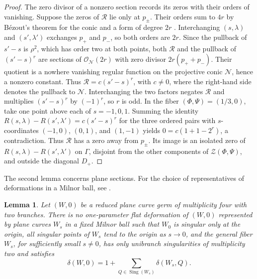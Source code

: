 \documentclass[11pt,letterpaper]{article}
\numberwithin{equation}{section}
\newtheorem{lemma}[lemma]{Lemma}
\theoremstyle{remark}
\theoremstyle{plain}
\begin{document}
\begin{proof}
The zero divisor of a nonzero section records its zeros with their
orders of vanishing.
Suppose the zeros of $\mathcal R$ lie only at $p_\pm$.  Their orders sum to $4r$
by B\'ezout's theorem for the conic and a form of degree $2r$
\cite[Section~2.6, p.~54]{CasasAlvero}.
Interchanging $(s,\lambda)$ and $(s',\lambda')$ exchanges $p_+$ and $p_-$, so both
orders are $2r$.  Since the pullback of $s'-s$ is $\rho^2$, which has order two at both
points, both $\mathcal R$ and the pullback of $(s'-s)^r$ are
sections of $\mathcal O_{\mathcal N}(2r)$ with zero divisor
$2r(p_++p_-)$.  Their quotient is a nowhere vanishing regular
function on the projective conic $\mathcal N$, hence a
nonzero constant.
Thus $\mathcal R=c(s'-s)^r$, with $c\neq0$,
where the right-hand side denotes the pullback to $\mathcal N$.
Interchanging the two factors negates $\mathcal R$ and multiplies
$(s'-s)^r$ by $(-1)^r$, so $r$ is odd.
In the fiber $(\Phi,\Psi)=(1/3,0)$, take one
point above each of $s=-1,0,1$.  Summing the identity
$R(s,\lambda)-R(s',\lambda')=c(s'-s)^r$ for the three
ordered pairs with $s$-coordinates $(-1,0)$, $(0,1)$, and $(1,-1)$
yields $0=c(1+1-2^r)$, a contradiction.
Thus $\mathcal R$ has a zero away from $p_\pm$.  Its image is an isolated zero
of $R(s,\lambda)-R(s',\lambda')$ on $\Gamma$, disjoint from the other components of
$\mathcal Z(\Phi,\Psi)$, and outside the
diagonal $D_+$.
\end{proof}

The second lemma concerns plane sections.  For the choice of
representatives of deformations in a Milnor ball, see
\cite[Definition~2.2]{SteenbrinkSemicontinuity}.

\begin{lemma}
\label{lem:d2-forbidden-splitting}
Let $(W,0)$ be a reduced plane curve germ of multiplicity four with
two branches.  There is no one-parameter flat deformation of $(W,0)$
represented by plane curves $W_s$ in a fixed Milnor ball such that
$W_0$ is singular only at the origin, all singular points of $W_s$
tend to the origin as $s\to0$, and the general fiber $W_s$, for
sufficiently small $s\neq0$, has only unibranch singularities of
multiplicity two and satisfies
\begin{equation}
 \delta(W,0)=1+\sum_{Q\in\operatorname{Sing}(W_s)}\delta(W_s,Q).
 \label{eq:d2-forbidden-delta}
\end{equation}
\end{lemma}
\end{document}

